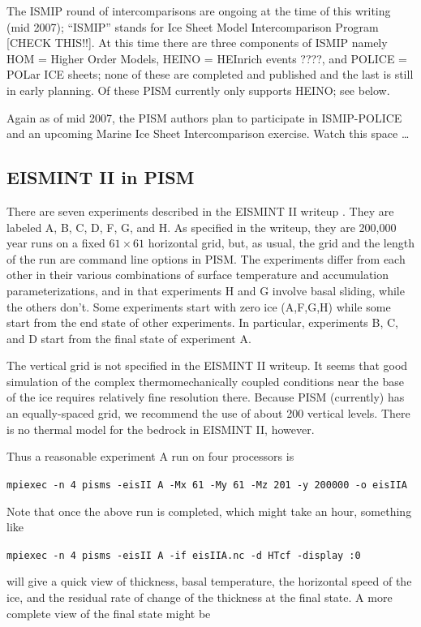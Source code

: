 \documentclass[11pt,final]{amsart}
\begin{document}
The ISMIP round of intercomparisons are ongoing at the time of this writing (mid 2007); ``ISMIP'' stands for Ice Sheet Model Intercomparison Program [CHECK THIS!!].  At this time there are three components of ISMIP namely HOM = Higher Order Models, HEINO = HEInrich events ????, and POLICE = POLar ICE sheets; none of these are completed and published and the last is still in early planning.  Of these PISM currently only supports HEINO; see below.

Again as of mid 2007, the PISM authors plan to participate in ISMIP-POLICE and an upcoming Marine Ice Sheet Intercomparison exercise.  Watch this space \dots

\subsection{EISMINT II in PISM}  There are seven experiments described in the EISMINT II writeup \cite{EISMINT00}. They are labeled A, B, C, D, F, G, and H.  As specified in the writeup, they are 200,000 year runs on a fixed $61\times 61$ horizontal grid, but, as usual, the grid and the length of the run are command line options in PISM.  The experiments differ from each other in their various combinations of surface temperature and accumulation parameterizations, and in that experiments H and G involve basal sliding, while the others don't.  Some experiments start with zero ice (A,F,G,H) while some start from the end state of other experiments.  In particular, experiments B, C, and D start from the final state of experiment A.

The vertical grid is not specified in the EISMINT II writeup.  It seems that good simulation of the complex thermomechanically coupled conditions near the base of the ice requires relatively fine resolution there.  Because PISM (currently) has an equally-spaced grid, we recommend the use of about 200 vertical levels.  There is no thermal model for the bedrock in EISMINT II, however.

Thus a reasonable experiment A run on four processors is

\verb|mpiexec -n 4 pisms -eisII A -Mx 61 -My 61 -Mz 201 -y 200000 -o eisIIA|

\noindent Note that once the above run is completed, which might take an hour, something like

\verb|mpiexec -n 4 pisms -eisII A -if eisIIA.nc -d HTcf -display :0|

\noindent will give a quick view of thickness, basal temperature, the horizontal speed of the ice, and the residual rate of change of the thickness at the final state.  A more complete view of the final state might be 
\end{document}
